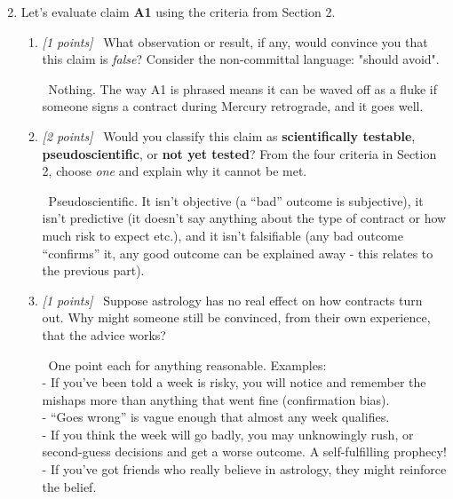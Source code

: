 \documentclass[11pt]{article}
\newcommand{\pts}[1]{\textit{[#1 points]}\ }
\newcommand{\ans}[1]{%
  \par\smallskip\noindent{\color{blue!55!black}\textbf{Answer:}}\ #1\par\smallskip}
\begin{document}
\begin{enumerate}
    \setcounter{enumi}{1}
    \item Let's evaluate claim \textbf{A1} using the criteria from Section 2.
    \begin{enumerate}[label=(\alph*)]
        \item \pts{1} What observation or result, if any, would convince you that this claim
        is \emph{false}?  Consider the non-committal language: "should avoid".

        \ans{Nothing. The way A1 is phrased means it can be waved off as a fluke if someone signs a contract during Mercury retrograde, and it goes well.}
        
        \item \pts{2} Would you classify this claim as \textbf{scientifically
        testable}, \textbf{pseudoscientific}, or \textbf{not yet tested}?
        From the four criteria in Section 2, choose \textit{one} and explain why it cannot be met.

        \ans{Pseudoscientific. It isn't objective (a ``bad'' outcome is subjective), it isn't  predictive (it doesn't say anything about the type of
    contract or how much risk to expect etc.), and it isn't
    falsifiable (any bad outcome ``confirms'' it, any good outcome can be
    explained away - this relates to the previous part).}


        \item \pts{1} Suppose astrology has no real effect on how contracts turn out.
        Why might someone still be convinced, from their own experience, that the
        advice works? 
        
        \ans{One point each for anything reasonable. Examples: \\
        - If you've been told a week is risky, you will notice and
        remember the mishaps more than anything that went fine (confirmation
        bias). \\
        - ``Goes wrong'' is vague enough that almost any week qualifies. \\
        - If you think the week will go badly, you may unknowingly rush, 
        or second-guess decisions and get a worse outcome. A
        self-fulfilling prophecy!  \\
        - If you've got friends who really believe in astrology, they might
        reinforce the belief. \\
        }
    \end{enumerate}
\end{enumerate}
\end{document}
